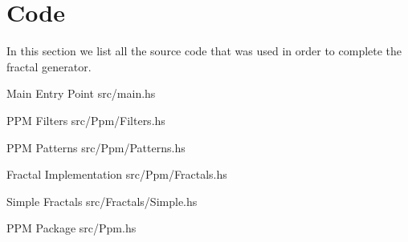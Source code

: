 \section{Code}

In this section we list all the source code that was used in order to complete
the fractal generator.

%
            {Main Entry Point}%
            {src/main.hs}

%
            {PPM Filters}%
            {src/Ppm/Filters.hs}

%
            {PPM Patterns}%
            {src/Ppm/Patterns.hs}

%
            {Fractal Implementation}%
            {src/Ppm/Fractals.hs}

%
            {Simple Fractals}%
            {src/Fractals/Simple.hs}

%
            {PPM Package}%
            {src/Ppm.hs}
